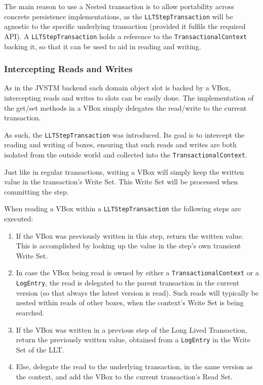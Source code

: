 \documentclass{llncs}
\begin{document}
The main reason to use a Nested transaction is to allow portability
across concrete persistence implementations, as the
\texttt{LLTStepTransaction} will be agnostic to the specific
underlying transaction (provided it fulfils the required API). A
\texttt{LLTStepTransaction} holds a reference to the
\texttt{TransactionalContext} backing it, so that it can be used to
aid in reading and writing.

\subsubsection{Intercepting Reads and Writes}

As in the JVSTM backend each domain object slot is backed by a VBox,
intercepting reads and writes to slots can be easily done. The
implementation of the get/set methods in a VBox simply delegates the
read/write to the current transaction.

As such, the \texttt{LLTStepTransaction} was introduced. Its goal is
to intercept the reading and writing of boxes, ensuring that such
reads and writes are both isolated from the outside world and
collected into the \texttt{TransactionalContext}.

Just like in regular transactions, writing a VBox will simply keep the
written value in the transaction's Write Set. This Write Set will be
processed when committing the step.

When reading a VBox within a \texttt{LLTStepTransaction} the following
steps are executed:

\begin{enumerate}

\item If the VBox was previously written in this step, return the
  written value. This is accomplished by looking up the value in the
  step's own transient Write Set.

\item In case the VBox being read is owned by either a
  \texttt{TransactionalContext} or a \texttt{LogEntry}, the read is
  delegated to the parent transaction in the current version (so that
  always the latest version is read). Such reads will typically be
  nested within reads of other boxes, when the context's Write Set is
  being searched.

\item If the VBox was written in a previous step of the Long Lived
  Transaction, return the previously written value, obtained from a
  \texttt{LogEntry} in the Write Set of the LLT.

\item Else, delegate the read to the underlying transaction, in the
  same version as the context, and add the VBox to the current
  transaction's Read Set.

\end{enumerate}
\end{document}
